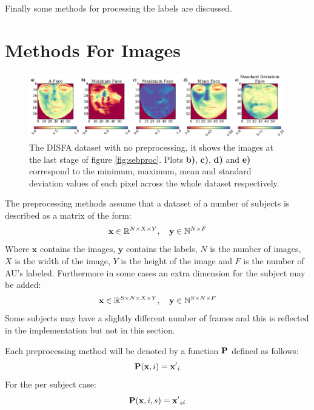     Finally some methods for processing the labels are discussed.

  \section{Methods For Images} \label{sec:methods}

    \begin{figure}[!h] \centering
    \includegraphics[width =\hsize]{figures/faces.pdf}
    \caption{The DISFA dataset with no preprocessing, it shows
    the images at the last stage of figure \ref{fig:sebproc}. Plots {\bf b)}, {\bf c)}, {\bf d)}
    and {\bf e)}
    correspond to the minimum, maximum, mean and standard deviation values of each pixel across
    the whole dataset respectively.} \label{fig:faces_none} \end{figure}

    The preprocessing methods assume that a dataset of a number of subjects
    is described as a matrix of the form:
    \begin{equation}
    {\bf x} \in \mathbb{R}^{N\times X \times Y},\quad {\bf y} \in \mathbb{N}^{N\times F}
    \end{equation}
    Where $\mathbf{x}$ contains the images, $\mathbf{y}$ contains the labels,
    $N$ is the number of images, $X$ is the width of the image, $Y$ is the height of the
    image and $F$ is the number of AU's labeled. Furthermore in some cases an extra dimension
    for the subject may be added:
    \begin{equation}
    {\bf x} \in \mathbb{R}^{S\times N\times X \times Y},\quad {\bf y} \in \mathbb{N}^{S\times N\times F}
    \end{equation}
    Some subjects may have a slightly different number of frames and this is reflected
    in the implementation but not in this section.

    Each preprocessing method will be denoted by a function ${\bf P}$ defined as follows:
    \begin{equation}
      {\bf P}({\bf x},i) = {\bf x'}_i
    \end{equation}
    For the per subject case:
    \begin{equation}
      {\bf P}({\bf x},i,s) = {\bf x'}_{si}
    \end{equation}

